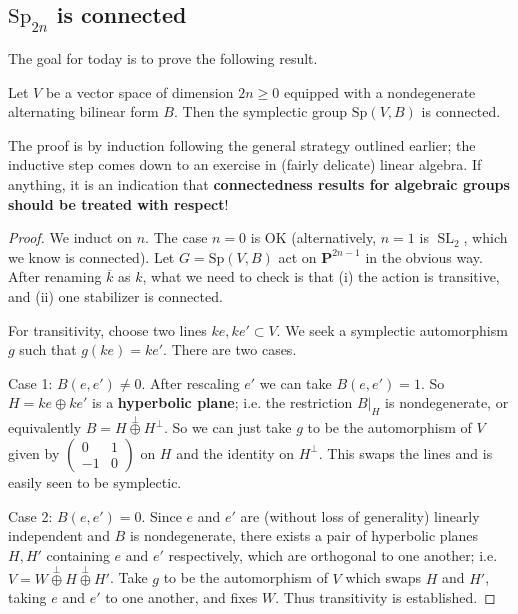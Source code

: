 \documentclass[10pt]{article}
\newcommand{\PP}{\mathbf{P}}
\newcommand{\SL}{\operatorname{SL}}
\renewcommand{\(}{\left(}
\renewcommand{\)}{\right)}
\renewcommand{\bar}{\overline}
\newcommand{\Sp}{\mathrm{Sp}}
\numberwithin{thm}{subsection}
\begin{document}
\subsection*{$\Sp_{2n}$ is connected}\label{spconn}
The goal for today is to prove the following result.
\begin{thm}Let $V$ be a vector space of dimension $2n\geq 0$
equipped with a nondegenerate alternating bilinear form $B$.
Then the symplectic group $\Sp(V,B)$ is connected.
\end{thm}
The proof is by induction following the general strategy outlined earlier;
the inductive step comes down to an exercise in (fairly delicate) linear algebra. If anything, it is an indication that \textbf{connectedness results for algebraic groups should be treated with respect}!
\begin{proof}
We induct on $n$.
The case $n=0$ is OK (alternatively, $n=1$ is $\SL_2$, which we know is connected).
Let $G=\Sp(V,B)$ act on $\PP^{2n-1}$ in the obvious way.
After renaming $\bar k$ as $k$, what we need to check is that
(i) the action is transitive, and (ii) one stabilizer is connected.

For transitivity, choose two lines $ke,ke'\subset V$.
We seek a symplectic automorphism $g$ such that $g(ke)=ke'$.
There are two cases.

Case 1: $B(e,e')\neq 0$. After rescaling $e'$ we can take $B(e,e')=1$.
So $H=ke\oplus ke'$ is a \textbf{hyperbolic plane}; i.e. the restriction
$B|_H$ is nondegenerate, or equivalently $B=H\stackrel{\perp}{\oplus}H^\perp$.
So we can just take $g$ to be the automorphism of $V$
given by $\(\begin{smallmatrix}0&1\\-1&0\end{smallmatrix}\)$
on $H$ and the identity on $H^\perp$.
This swaps the lines and is easily seen to be symplectic.

Case 2: $B(e,e')=0$. Since $e$ and $e'$ are (without loss of generality)
linearly independent and $B$ is nondegenerate, there exists a pair of hyperbolic planes $H,H'$ containing $e$ and $e'$ respectively, which are orthogonal to one another; i.e. $V=W\stackrel{\perp}{\oplus}H\stackrel{\perp}{\oplus}H'$.
Take $g$ to be the automorphism of $V$ which swaps $H$ and $H'$,
taking $e$ and $e'$ to one another, and fixes $W$. Thus transitivity is established.


\end{proof}
\end{document}
